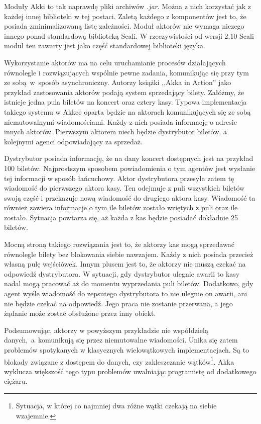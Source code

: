 \documentclass[wimgr]{xmgr}
\begin{document}
Moduły Akki to tak naprawdę pliki archiwów \emph{.jar}. Można z nich korzystać jak z każdej innej biblioteki w tej postaci. Zaletą każdego z komponentów jest to, że posiada zminimalizowaną listę zależności. Moduł aktorów nie wymaga niczego innego ponad standardową biblioteką Scali. W rzeczywistości od wersji 2.10 Scali moduł ten zawarty jest jako część standardowej biblioteki języka. 

Wykorzystanie aktorów ma na celu uruchamianie procesów działających równolegle i rozwiązujących wspólnie pewne zadania, komunikując się przy tym ze sobą~w~sposób asynchroniczny. Autorzy książki ,,Akka in Action'' \cite[s. 9]{Roestenburg:2012:AIA} jako przykład zastosowania aktorów podają system sprzedający bilety. Załóżmy, że istnieje jedna pula biletów na koncert oraz cztery kasy. Typowa implementacja takiego systemu w Akkce oparta będzie na aktorach komunikujących się ze sobą niemutowalnymi wiadomościami. Każdy z nich posiada informację o adresie innych aktorów. Pierwszym aktorem niech będzie dystrybutor biletów, a kolejnymi agenci odpowiadający za sprzedaż.

Dystrybutor posiada informację, że na dany koncert dostępnych jest na przykład 100 biletów. Najprostszym sposobem powiadomienia o tym agentów jest wysłanie tej informacji w sposób łańcuchowy. Aktor dystrybutora przesyła zatem tę wiadomość do pierwszego aktora kasy. Ten odejmuje z puli wszystkich biletów swoją część i przekazuje nową wiadomość do drugiego aktora kasy. Wiadomość ta również zawiera informacje o tym ile biletów zostało wziętych z puli oraz ile zostało. Sytuacja powtarza się, aż każda z kas będzie posiadać dokładnie 25 biletów.

Mocną stroną takiego rozwiązania jest to, że aktorzy kas mogą sprzedawać równolegle bilety bez blokowania siebie nawzajem. Każdy z nich posiada przecież własną pulę wejściówek. Innym plusem jest to, że aktorzy nie muszą czekać na odpowiedź dystrybutora. W sytuacji, gdy dystrybutor ulegnie awarii to kasy nadal mogą pracować aż do momentu wyprzedania puli biletów. Dodatkowo, gdy agent wyśle wiadomość do zepsutego dystrybutora to nie ulegnie on awarii, ani nie będzie czekać na odpowiedź. Jego praca nie zostanie przerwana, a jego żądanie może zostać obsłużone przez inny obiekt.

Podsumowując, aktorzy w powyższym przykładzie nie współdzielą danych,~a~komunikują się przez niemutowalne wiadomości. Unika się zatem problemów spotykanych w klasycznych wielowątkowych implementacjach. Są to blokady związane z dostępem do danych, czy zakleszczanie wątków\footnote{Sytuacja, w której co najmniej dwa różne wątki czekają na siebie wzajemnie.}. Akka wyklucza większość tego typu problemów uwalniając programistę od dodatkowego ciężaru.
\end{document}

